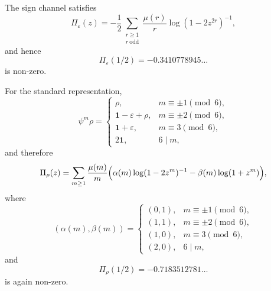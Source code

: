 \begin{proposition}
  \label{prop:s3-example-primitive-channels}
  The sign channel satisfies
  \begin{equation}\label{eq:s3-example-pi-eps}
    \Pi_\varepsilon(z)
    =
    -\frac12
      \sum_{\substack{r\ge 1\\ r\ \mathrm{odd}}}
        \frac{\mu(r)}{r}\log(1-2z^{2r})^{-1},
  \end{equation}
  and hence
  \begin{equation}\label{eq:s3-example-pi-eps-value}
    \Pi_\varepsilon(1/2)
    =-0.3410778945\ldots
  \end{equation}
  is non-zero.

  For the standard representation,
  \begin{equation}\label{eq:s3-example-adams-rho}
    \psi^m\rho=
    \begin{cases}
      \rho, & m\equiv \pm 1 \pmod 6, \\
      \mathbf 1-\varepsilon+\rho, & m\equiv \pm 2 \pmod 6, \\
      \mathbf 1+\varepsilon, & m\equiv 3 \pmod 6, \\
      2\mathbf 1, & 6\mid m,
    \end{cases}
  \end{equation}
  and therefore
  \begin{equation}\label{eq:s3-example-pi-rho}
    \Pi_\rho(z)
    =
    \sum_{m\ge 1}\frac{\mu(m)}{m}
      \Bigl(
        \alpha(m)\log(1-2z^m)^{-1}
        -\beta(m)\log(1+z^m)
      \Bigr),
  \end{equation}
  where
  \begin{equation}\label{eq:s3-example-alpha-beta}
    (\alpha(m),\beta(m))=
    \begin{cases}
      (0,1), & m\equiv \pm 1 \pmod 6, \\
      (1,1), & m\equiv \pm 2 \pmod 6, \\
      (1,0), & m\equiv 3 \pmod 6, \\
      (2,0), & 6\mid m,
    \end{cases}
  \end{equation}
  and
  \begin{equation}\label{eq:s3-example-pi-rho-value}
    \Pi_\rho(1/2)
    =-0.7183512781\ldots
  \end{equation}
  is again non-zero.
\end{proposition}

